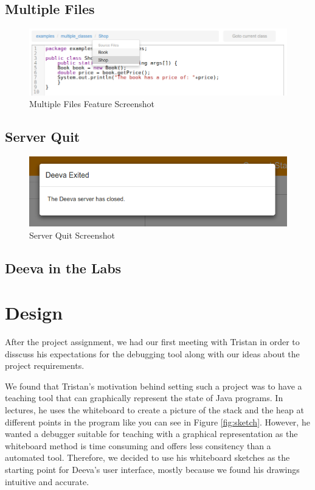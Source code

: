 \documentclass[11pt, a4paper]{article}
\begin{document}
\subsection{Multiple Files}
\begin{figure}[h!]
\centering
\includegraphics[scale=0.5]{multipleFileFeature.png}
\caption{Multiple Files Feature Screenshot}
\label{fig:multipleFile}
\end{figure}

\subsection{Server Quit}
\begin{figure}[h!]
\centering
\includegraphics[scale=0.6]{exitFeature.png}
\caption{Server Quit Screenshot}
\label{fig:quitFeature}
\end{figure}

\subsection{Deeva in the Labs}
\section{Design}

After the project assignment, we had our first meeting with Tristan in order to disscuss his expectations for the debugging tool along with our ideas about the project requirements.

We found that Tristan's motivation behind setting such a project was to have a teaching tool that can graphically represent the state of Java programs. In lectures, he uses the whiteboard to create a picture of the stack and the heap at different points in the program like you can see in Figure \ref{fig:sketch}. However, he wanted a debugger suitable for teaching with a graphical representation as the whiteboard method is time consuming and offers less consitency than a automated tool.
Therefore, we decided to use his whiteboard sketches as the starting point for Deeva's user interface, mostly because we found his drawings intuitive and accurate.
\end{document}
